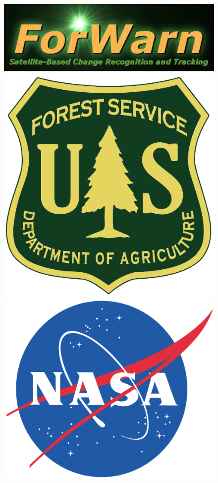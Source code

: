 \begin{frame}
 \vskip-0.1in
 \begin{figure}
  \begin{center}
   \includegraphics[height=0.15\textheight]{logos/ForWarn_Logo}
   \hfill
   \includegraphics[width=0.14\textheight]{logos/USFS_Logo}
   \hfill
   \includegraphics[width=0.17\textheight]{logos/NASA_Logo}

\end{center}
\end{figure}
\end{frame}
